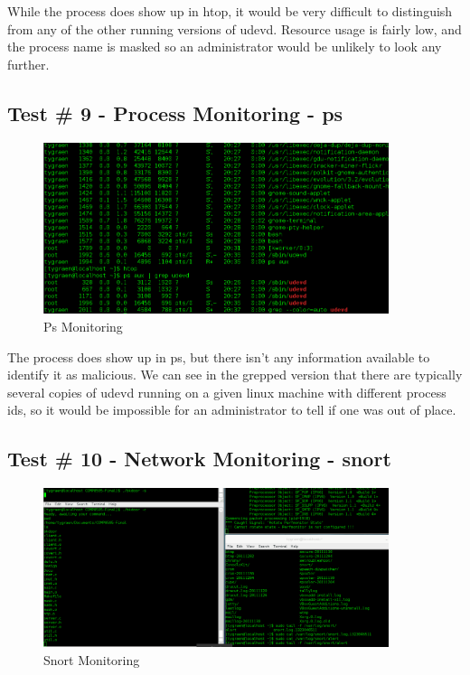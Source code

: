 \documentclass[titlepage]{article}
\begin{document}
While the process does show up in htop, it would be very difficult to distinguish from any of the other running versions of udevd.  Resource usage is fairly low, and the process name is masked so an administrator would be unlikely to look any further.

\clearpage

\subsection{Test \# 9 - Process Monitoring - ps}

\begin{figure}[htb]                                                                       
  \begin{center}
    \includegraphics[width=0.9\textwidth]{Pictures/ps.png}
  \end{center}
  \caption{Ps Monitoring}
  \label{fig:ps}
\end{figure}

The process does show up in ps, but there isn't any information available to identify it as malicious. We can see in the grepped version that there are typically several copies of udevd running on a given linux machine with different process ids, so it would be impossible for an administrator to tell if one was out of place.  

\clearpage

\subsection{Test \# 10 - Network Monitoring - snort}

\begin{figure}[htb]                                                                       
  \begin{center}
    \includegraphics[width=0.9\textwidth]{Pictures/snort.png}
  \end{center}
  \caption{Snort Monitoring}
  \label{fig:snort}
\end{figure}
\end{document}
